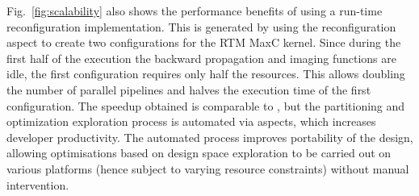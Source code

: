 Fig.~\ref{fig:scalability} also shows the performance benefits of
using a run-time reconfiguration implementation. This is generated by
using the reconfiguration aspect to create two configurations for the
RTM MaxC kernel. Since during the first half of the execution the
backward propagation and imaging functions are idle, the first
configuration requires only half the resources. This allows doubling
the number of parallel pipelines and halves the execution time of the
first configuration. The speedup obtained is comparable to
\cite{Xinyu:Qiwei:Luk:Qiang:Pell:2012}, but the partitioning and
optimization exploration process is automated via aspects, which
increases developer productivity. The automated process improves
portability of the design, allowing optimisations based on design
space exploration to be carried out on various platforms (hence
subject to varying resource constraints) without manual intervention.
